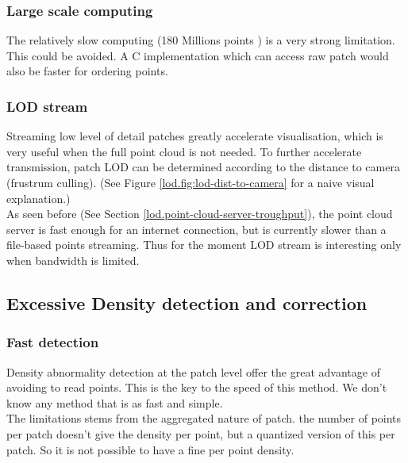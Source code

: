 	 \subsubsection{Large scale computing} 
		 The relatively slow computing (180 Millions points \per \hour ) is a very strong limitation.
		 This could be avoided. A C implementation which can access raw patch would also be faster for ordering points.
		 
	 \subsubsection{LOD stream}
		 Streaming low level of detail patches greatly accelerate visualisation,
		 which is very useful when the full point cloud is not needed.
		 To further accelerate transmission, patch LOD can be determined according to the distance to camera (frustrum culling). (See Figure \ref{lod.fig:lod-dist-to-camera} for a naive visual explanation.)
		 \\
		 As seen before (See Section \ref{lod.point-cloud-server-troughput}), the point cloud server is fast enough for an internet connection, but is currently slower than a file-based points streaming. Thus for the moment LOD stream is interesting only when bandwidth is limited.
	
	\subsection{Excessive Density detection and correction}
		\subsubsection{Fast detection}
		Density abnormality detection at the patch level offer the great advantage of avoiding to read points. This is the key to the speed of this method. We don't know any method that is as fast and simple.
		\\
		The limitations stems from the aggregated nature of patch. the number of points per patch doesn't give the density per point, but a quantized version of this per patch.
		So it is not possible to have a fine per point density.
	 
		
